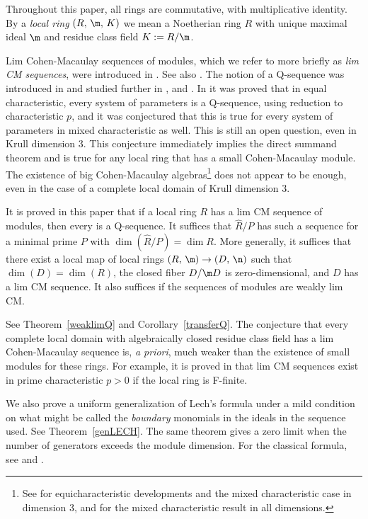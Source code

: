 \documentclass[12pt]{amsart}
\theoremstyle{plain}
\theoremstyle{remark}
\theoremstyle{definition}
\numberwithin{equation}{theorem}
\begin{document}
Throughout this paper, all rings are commutative, with multiplicative identity.
By a {\it local ring } $(R,\, \m, \, K)$  we mean a Noetherian ring $R$ with unique maximal 
ideal $\m$ and residue class field  $K :=  R/\m$.  

Lim Cohen-Macaulay sequences of modules, which we refer to more briefly 
as {\it lim CM sequences}, were introduced in \cite{BHM26}. See also \cite{Ho17, Ma17, Ma23}.   
The notion of a Q-sequence was introduced in \cite{HoHu09}
and studied further in \cite{HoZh18, Ji21, Ji25, Str25}, and \cite{HoJi26}.  
In \cite{HoHu09} it was proved that 
in equal characteristic, every system of parameters is a Q-sequence,  using 
reduction to characteristic $p$, and it was conjectured that this is true
for every system of parameters in mixed characteristic as well.  This is 
still an open question, even in Krull dimension 3.  This conjecture immediately 
implies the direct summand theorem 
\cite{Ho73, Ho83, And18, Bha18}  and is true for any local ring 
that has a small Cohen-Macaulay module. The existence of big 
Cohen-Macaulay algebras\footnote{See \cite{Ho94, HoHu92, HoHu95, Ho02} for 
equicharacteristic developments and the mixed characteristic case in dimension 3, 
and  \cite{And20, Bha20} for the  mixed characteristic result in all dimensions.}
does not appear to be enough, even in the case of a complete local domain of Krull dimension 3. 

It is proved in this paper that if a local ring $R$ has a lim CM sequence of modules, then 
every \sop is a Q-sequence. It suffices that $\widehat R/P$ has such a sequence for a minimal prime $P$ with $\dim(\widehat R/P)=\dim R$. More generally, it suffices that there exist a local map
of local rings $(R,\, \m) \to (D,\, \n)$ such that $\dim(D) = \dim(R)$, the closed fiber
$D/\m D$ is zero-dimensional, and $D$ has a lim CM sequence. It also suffices if the sequences
of modules are weakly lim CM.

See Theorem~\ref{weaklimQ} and Corollary~\ref{transferQ}.
The conjecture that every complete local domain with algebraically closed 
residue class field has a lim Cohen-Macaulay sequence is, {\it a priori}, much weaker 
than the existence of small \CM modules for these rings.
For example, it is proved in \cite{BHM26} that
lim CM sequences exist in prime characteristic $p>0$ if the local ring 
is F-finite.

We also prove a uniform generalization of Lech's formula under
a mild condition on what might be called the {\it boundary} monomials 
in the ideals in the sequence used. 
See Theorem~\ref{genLECH}. The same theorem gives a zero limit 
when the number of generators exceeds the module dimension. For the 
classical formula, see \cite[Thm.\,11.2.10,\,p.\,229]{SwHu06} and \cite{Lech57}. 
\end{document}
